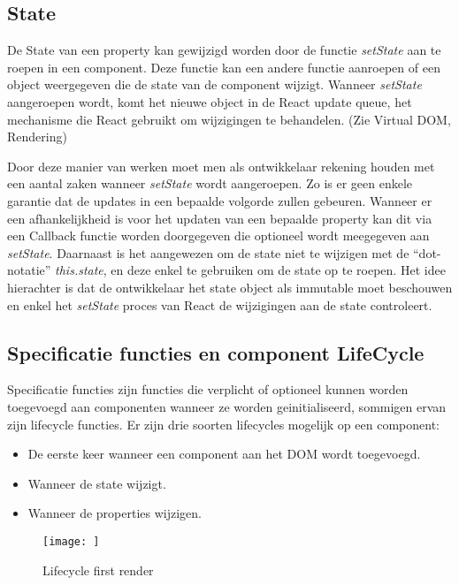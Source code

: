 	\subsection{State}
		
		De State van een property kan gewijzigd worden door de functie \emph{setState} aan te roepen in een component. Deze functie kan een andere functie aanroepen of een object weergegeven die de state van de component wijzigt. Wanneer \emph{setState} aangeroepen wordt, komt het nieuwe object in de React update queue, het mechanisme die React gebruikt om wijzigingen te behandelen. (Zie Virtual DOM, Rendering)
		
		Door deze manier van werken moet men als ontwikkelaar rekening houden met een aantal zaken wanneer \emph{setState} wordt aangeroepen. Zo is er geen enkele garantie dat de updates in een bepaalde volgorde zullen gebeuren. Wanneer er een afhankelijkheid is voor het updaten van een bepaalde property kan dit via een Callback functie worden doorgegeven die optioneel wordt meegegeven aan \emph{setState}. Daarnaast is het aangewezen om de state niet te wijzigen met de ``dot-notatie'' \emph{this.state}, en deze enkel te gebruiken om de state op te roepen. Het idee hierachter is dat de ontwikkelaar het state object als immutable moet beschouwen en enkel het \emph{setState} proces van React de wijzigingen aan de state controleert.
	
	\subsection{Specificatie functies en component LifeCycle}
		
		Specificatie functies zijn functies die verplicht of optioneel kunnen worden toegevoegd aan componenten wanneer ze worden geinitialiseerd, sommigen ervan zijn lifecycle functies. Er zijn drie soorten lifecycles mogelijk op een component:
		
		\begin{itemize}
			\item De eerste keer wanneer een component aan het DOM wordt toegevoegd.
			\item Wanneer de state wijzigt.
			\item Wanneer de properties wijzigen.
		\end{itemize}
		
		\begin{figure}
			\centering
			\texttt{[image: ]}%
			\caption{Lifecycle first render}%
			\label{fig:lifecyclefirstrender}%
		\end{figure}
	
